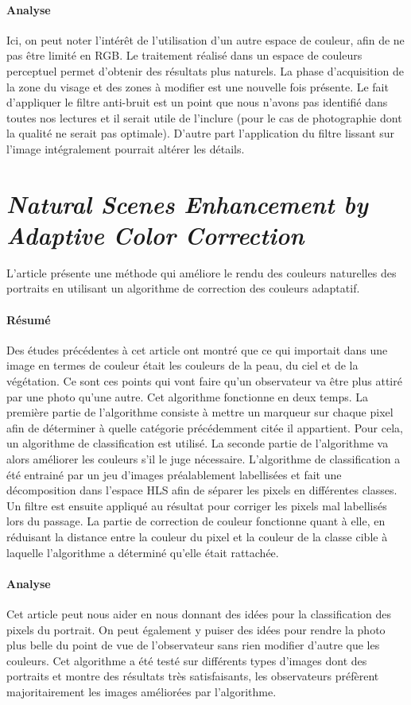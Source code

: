 \documentclass[11pt, french,screen]{report-rd-info}
\begin{document}
\paragraph{Analyse}
Ici, on peut noter l'intérêt de l'utilisation d'un autre espace de couleur, afin de ne pas être limité en RGB. Le traitement réalisé dans un espace de couleurs perceptuel permet d'obtenir des résultats plus naturels. La phase d'acquisition de la zone du visage et des zones à modifier est une nouvelle fois présente.
Le fait d’appliquer le filtre anti-bruit est un point que nous n’avons pas identifié dans toutes nos lectures et il serait utile de l’inclure (pour le cas de photographie dont la qualité ne serait pas optimale). D’autre part l’application du filtre lissant sur l’image intégralement pourrait altérer les détails.
\section{\emph{Natural Scenes Enhancement by Adaptive Color Correction}}
L'article \cite{Naccari} présente une méthode qui améliore le rendu des couleurs naturelles des portraits en utilisant un algorithme de correction des couleurs adaptatif.
\paragraph{Résumé}
Des études précédentes à cet article ont montré que ce qui importait dans une image en termes de couleur était les couleurs de la peau, du ciel et de la végétation. Ce sont ces points qui vont faire qu'un observateur va être plus attiré par une photo qu'une autre. Cet algorithme fonctionne en deux temps. La première partie de l'algorithme consiste à mettre un marqueur sur chaque pixel afin de déterminer à quelle catégorie précédemment citée il appartient. Pour cela, un algorithme de classification est utilisé. La seconde partie de l'algorithme va alors améliorer les couleurs s'il le juge nécessaire.
L'algorithme de classification a été entrainé par un jeu d'images préalablement labellisées et fait une décomposition dans l'espace HLS afin de séparer les pixels en différentes classes. Un filtre est ensuite appliqué au résultat pour corriger les pixels mal labellisés lors du passage.
La partie de correction de couleur fonctionne quant à elle, en réduisant la distance entre la couleur du pixel et la couleur de la classe cible à laquelle l'algorithme a déterminé qu'elle était rattachée.
\paragraph{Analyse}
Cet article peut nous aider en nous donnant des idées pour la classification des pixels du portrait.
On peut également y puiser des idées pour rendre la photo plus belle du point de vue de l'observateur sans rien modifier d'autre que les couleurs.
Cet algorithme a été testé sur différents types d'images dont des portraits et montre des résultats très satisfaisants, les observateurs préfèrent majoritairement les images améliorées par l'algorithme.
\end{document}
